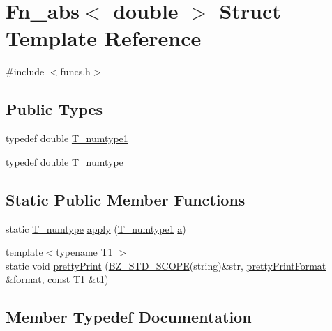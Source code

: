 \hypertarget{structFn__abs_3_01double_01_4}{}\section{Fn\+\_\+abs$<$ double $>$ Struct Template Reference}
\label{structFn__abs_3_01double_01_4}


{\ttfamily \#include $<$funcs.\+h$>$}

\subsection*{Public Types}
\begin{DoxyCompactItemize}
\item 
typedef double \hyperlink{structFn__abs_3_01double_01_4_a92fc24e78f2e91a8a3481a3015cbbb26}{T\+\_\+numtype1}
\item 
typedef double \hyperlink{structFn__abs_3_01double_01_4_a377392279a71cbf7ec2e5cb4fc95219c}{T\+\_\+numtype}
\end{DoxyCompactItemize}
\subsection*{Static Public Member Functions}
\begin{DoxyCompactItemize}
\item 
static \hyperlink{structFn__abs_3_01double_01_4_a377392279a71cbf7ec2e5cb4fc95219c}{T\+\_\+numtype} \hyperlink{structFn__abs_3_01double_01_4_a3dbb9187915d647a562bab39f501596b}{apply} (\hyperlink{structFn__abs_3_01double_01_4_a92fc24e78f2e91a8a3481a3015cbbb26}{T\+\_\+numtype1} \hyperlink{gen__mat5files_8m_aae328bf20413f220e38aec4d95bfd6da}{a})
\item 
{\footnotesize template$<$typename T1 $>$ }\\static void \hyperlink{structFn__abs_3_01double_01_4_ac022949df2c1f3637172af842da5ff17}{pretty\+Print} (\hyperlink{numinquire_8h_a2b24ffc3b4ef9803956bc7715c6c7b83}{B\+Z\+\_\+\+S\+T\+D\+\_\+\+S\+C\+O\+P\+E}(string)\&str, \hyperlink{classprettyPrintFormat}{pretty\+Print\+Format} \&format, const T1 \&\hyperlink{sparse_2linalg_2eigen_2arpack_2ARPACK_2SRC_2stat_8h_af377a4e2b03dbeb6590856bdfca3df30}{t1})
\end{DoxyCompactItemize}


\subsection{Member Typedef Documentation}
\hypertarget{structFn__abs_3_01double_01_4_a377392279a71cbf7ec2e5cb4fc95219c}{}
